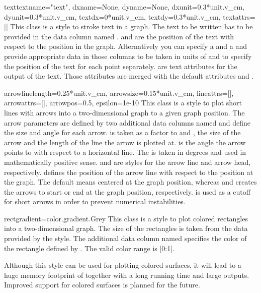 \begin{classdesc}{text}{textname="text", dxname=None, dyname=None, %
                        dxunit=0.3*unit.v\_cm, dyunit=0.3*unit.v\_cm,
                        textdx=0*unit.v\_cm, textdy=0.3*unit.v\_cm,
                        textattrs=[]}
  This class is a style to stroke text in a graph. The
  text to be written has to be provided in the data column named
  .  and  are the position of the
  text with respect to the position in the graph. Alternatively you can
  specify a  and a  and provide appropriate
  data in those columns to be taken in units of  and
   to specify the position of the text for each point
  separately.  are text attributes for the output of
  the text. Those attributes are merged with the default attributes
   and .
\end{classdesc} %

\begin{classdesc}{arrow}{linelength=0.25*unit.v\_cm, %
                         arrowsize=0.15*unit.v\_cm,
                         lineattrs=[], arrowattrs=[], arrowpos=0.5,
                         epsilon=1e-10}
  This class is a style to plot short lines with arrows into a
  two-dimensional graph to a given graph position. The arrow
  parameters are defined by two additional data columns named
   and  define the size and angle for each
  arrow.  is taken as a factor to  and
  , the size of the arrow and the length of the line
  the arrow is plotted at.  is the angle the arrow points
  to with respect to a horizontal line. The  is taken in
  degrees and used in mathematically positive sense. 
  and  are styles for the arrow line and arrow head,
  respectively.  defines the position of the arrow line
  with respect to the position at the graph. The default 
  means centered at the graph position, whereas  and 
  creates the arrows to start or end at the graph position,
  respectively.  is used as a cutoff for short arrows in
  order to prevent numerical instabilities.
\end{classdesc} %

\begin{classdesc}{rect}{gradient=color.gradient.Grey} %
  This class is a style to plot colored rectangles into a
  two-dimensional graph. The size of the rectangles is taken from
  the data provided by the  style. The additional
  data column named  specifies the color of the rectangle
  defined by . The valid color range is [0:1].

  \begin{note}
    Although this style can be used for plotting colored surfaces, it
    will lead to a huge memory footprint of \PyX{} together with a
    long running time and large outputs. Improved support for colored
    surfaces is planned for the future.
  \end{note}
\end{classdesc} %

